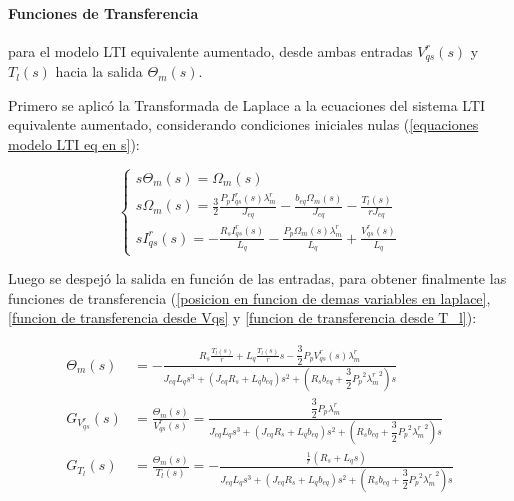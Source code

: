 \documentclass[a4paper, 10pt, onecolumn,journal]{ieeeconf}
\begin{document}
\paragraph{\textbf{Funciones de Transferencia}}
para el modelo LTI equivalente aumentado, desde ambas entradas $V^r_{qs}(s)$ y $T_l(s)$ hacia la salida ${\Theta}_m(s)$.

Primero se aplicó la Transformada de Laplace a la ecuaciones del sistema LTI equivalente aumentado, considerando condiciones iniciales nulas (\cref{equaciones modelo LTI eq en s}):

\begin{equation}
	\begin{cases}
		s{\Theta}_m(s) = {\Omega}_m(s)\\
		s{\Omega}_m(s) = \frac{3}{2} \frac{P_p I^r_{qs}(s)\lambda^r_m}{J_{eq}} - \frac{b_{eq}\Omega_m(s)}{J_{eq}} - \frac{T_l(s)}{r J_{eq}}\\
		s{I}^r_{qs}(s) = -\frac{R_s I^r_{qs}(s)}{L_q} - \frac{P_p \Omega_m(s) \lambda^r_m}{L_q}+ \frac{V^r_{qs}(s)}{L_q}	
	\end{cases}
	\label{equaciones modelo LTI eq en s}
\end{equation}

Luego se despejó la salida en función de las entradas, para obtener finalmente las funciones de transferencia (\cref{posicion en funcion de demas variables en laplace}, \cref{funcion de transferencia desde Vqs} y \cref{funcion de transferencia desde T_l}):

\begin{align}
	{\Theta}_m(s) &= -\frac{R_{s} \frac{T_l(s)}{r} + L_{q} \frac{T_l(s)}{r} s - \dfrac{3}{2} P_{p} V^r_{qs}(s) \lambda^r_m}{J_{eq} L_{q} s^3 +\left( J_{eq} R_{s} + L_{q} b_{eq} \right)s^2 + \left( R_{s} b_{eq} + \dfrac{3}{2} {P_{p}}^2 { \lambda^r_m}^2\right) s}\label{posicion en funcion de demas variables en laplace}\\
	G_{V^r_{qs}}(s) &= \frac{{\Theta}_m(s)}{V^r_{qs}(s)} = \frac{\dfrac{3}{2} P_{p} \lambda^r_m}{J_{eq} L_{q} s^3 +\left( J_{eq} R_{s} + L_{q} b_{eq} \right)s^2 + \left( R_{s} b_{eq} + \dfrac{3}{2} {P_{p}}^2 { \lambda^r_m}^2\right) s}\label{funcion de transferencia desde Vqs}\\
	G_{T_l}(s) &= \frac{{\Theta}_m(s)}{T_l(s)} = -\frac{\frac{1}{r}\left( R_{s} + L_{q} s\right) }{J_{eq} L_{q} s^3 +\left( J_{eq} R_{s} + L_{q} b_{eq} \right)s^2 + \left( R_{s} b_{eq} + \dfrac{3}{2} {P_{p}}^2 { \lambda^r_m}^2\right) s}
	\label{funcion de transferencia desde T_l}
\end{align}
\end{document}
